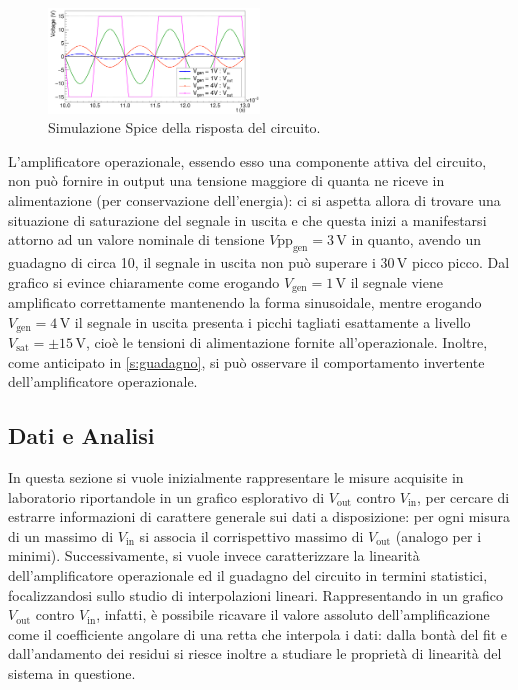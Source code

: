 \documentclass[a4paper,11pt]{article} %
\begin{document}
\begin{figure}
	\centering
	\includegraphics[width=0.5\textwidth]{../Plots/Report_Plots/opamp_spice_1V_4V_BIG.png}
	\caption{\footnotesize Simulazione Spice della risposta del circuito.}
	\label{i:opamp_simulation}
\end{figure}

\noindent L'amplificatore operazionale, essendo esso una componente attiva del circuito, non può fornire in output una
tensione maggiore di quanta ne riceve in alimentazione (per conservazione dell'energia): ci si aspetta allora di trovare
una situazione di saturazione del segnale in uscita e che questa inizi a manifestarsi attorno ad un valore nominale di
tensione $V\text{pp}_{\text{gen}}=3\,\si{\volt}$ in quanto, avendo un guadagno di circa 10, il segnale in uscita non può
superare i $30\,\si{\volt}$ picco picco. Dal grafico si evince chiaramente come erogando $V_{\text{gen}}=1\,\si{\volt}$
il segnale viene amplificato correttamente mantenendo la forma sinusoidale, mentre erogando
$V_{\text{gen}}=4\,\si{\volt}$ il segnale in uscita presenta i picchi tagliati esattamente a livello $V_{\text{sat}}=\pm
15\,\si{\volt}$, cioè le tensioni di alimentazione fornite all'operazionale. Inoltre, come anticipato in
\autoref{s:guadagno}, si può osservare il comportamento invertente dell'amplificatore operazionale.



\subsection{Dati e Analisi}
In questa sezione si vuole inizialmente rappresentare le misure acquisite in laboratorio riportandole in un grafico
esplorativo di $V_{\text{out}}$ contro $V_{\text{in}}$, per cercare di estrarre informazioni di carattere generale sui
dati a disposizione: per ogni misura di un massimo di $V_{\text{in}}$ si associa il corrispettivo massimo di
$V_{\text{out}}$ (analogo per i minimi). Successivamente, si vuole invece caratterizzare la linearità dell'amplificatore
operazionale ed il guadagno del circuito in termini statistici, focalizzandosi sullo studio di interpolazioni lineari.
Rappresentando in un grafico $V_{\text{out}}$ contro $V_{\text{in}}$, infatti, è possibile ricavare il valore assoluto
dell'amplificazione come il coefficiente angolare di una retta che interpola i dati: dalla bontà del fit e
dall'andamento dei residui si riesce inoltre a studiare le proprietà di linearità del sistema in questione. 
\end{document}
